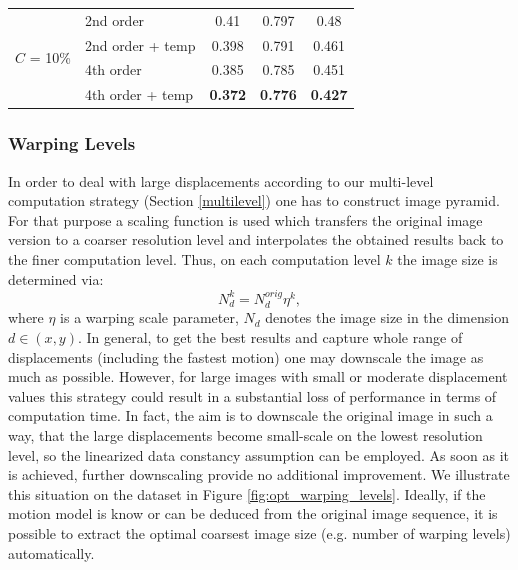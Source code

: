 \begin{table}[ht]
\begin{tabular}{ccccc}
     \midrule
    \multicolumn{1}{c}{\multirow{4}[0]{*}{$C$ = 10\%}} & \multicolumn{1}{l}{2nd order} & 0.41  & 0.797 & 0.48 \\
    \multicolumn{1}{c}{} & \multicolumn{1}{l}{2nd order + temp} & 0.398 & 0.791 & 0.461 \\
    \multicolumn{1}{c}{} & \multicolumn{1}{l}{4th order} & 0.385 & 0.785 & 0.451 \\
    \multicolumn{1}{c}{} & \multicolumn{1}{l}{4th order + temp} & \textbf{0.372} & \textbf{0.776} & \textbf{0.427} \\
    \bottomrule
    \end{tabular}%
  \label{tab:derivatives_contrast}%
\end{table}%




\subsubsection{Warping Levels}
\label{opt_warping_levels}

In order to deal with large displacements  according to our multi-level computation strategy (Section \ref{multilevel}) one has to construct image pyramid. For that purpose a scaling function is used which transfers the original image version to a coarser resolution level and interpolates the obtained results back to the finer computation level. Thus, on each computation level $k$ the image size is determined via:
$$ N^k_{d} = N^{orig} _{d} \eta^k,$$
where $\eta$ is a warping scale parameter, $N_d$ denotes the image size in the dimension $d \in (x,y)$.
In general, to get the best results and capture whole range of displacements (including the fastest motion) one may downscale the image as much as possible. However, for large images with small or moderate displacement values this strategy could result in a substantial loss of performance in terms of computation time. In fact, the aim is to downscale the original image in such a way, that the large displacements become small-scale on the lowest resolution level, so the linearized data constancy assumption can be employed. As soon as it is achieved, further downscaling provide no additional improvement. We illustrate this situation on the \rub dataset in Figure \ref{fig:opt_warping_levels}. Ideally, if the motion model is know or can be deduced from the original image sequence, it is possible to extract the optimal coarsest image size (e.g. number of warping levels) automatically.

